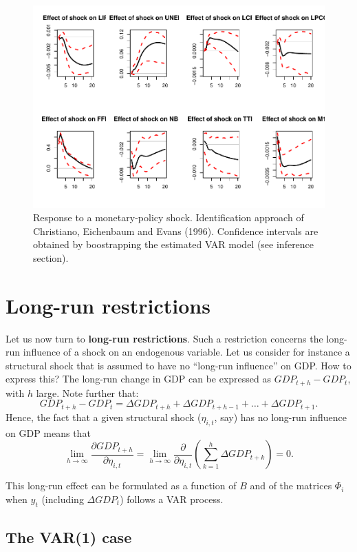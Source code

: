 \documentclass[
  12pt,
]{book}
\theoremstyle{definition}
\theoremstyle{definition}
\theoremstyle{definition}
\theoremstyle{definition}
\theoremstyle{remark}
\begin{document}
\begin{figure}
\includegraphics[width=0.95\linewidth]{IdentifStructShocks_files/figure-latex/CEE-1} \caption{Response to a monetary-policy shock. Identification approach of Christiano, Eichenbaum and Evans (1996). Confidence intervals are obtained by boostrapping the estimated VAR model (see inference section).}\label{fig:CEE}
\end{figure}

\section{Long-run restrictions}\label{long-run-restrictions}

Let us now turn to \textbf{long-run restrictions}. Such a restriction concerns the long-run influence of a shock on an endogenous variable. Let us consider for instance a structural shock that is assumed to have no ``long-run influence'' on GDP. How to express this? The long-run change in GDP can be expressed as \(GDP_{t+h} - GDP_t\), with \(h\) large. Note further that:
\[
GDP_{t+h} - GDP_t = \Delta GDP_{t+h} +\Delta GDP_{t+h-1} + \dots + \Delta GDP_{t+1}.
\]
Hence, the fact that a given structural shock (\(\eta_{i,t}\), say) has no long-run influence on GDP means that
\[
\lim_{h\rightarrow\infty}\frac{\partial GDP_{t+h}}{\partial \eta_{i,t}} = \lim_{h\rightarrow\infty} \frac{\partial}{\partial \eta_{i,t}}\left(\sum_{k=1}^h \Delta  GDP_{t+k}\right)= 0.
\]

This long-run effect can be formulated as a function of \(B\) and of the matrices \(\Phi_i\) when \(y_t\) (including \(\Delta GDP_t\)) follows a VAR process.

\subsection{The VAR(1) case}\label{the-var1-case}
\end{document}
